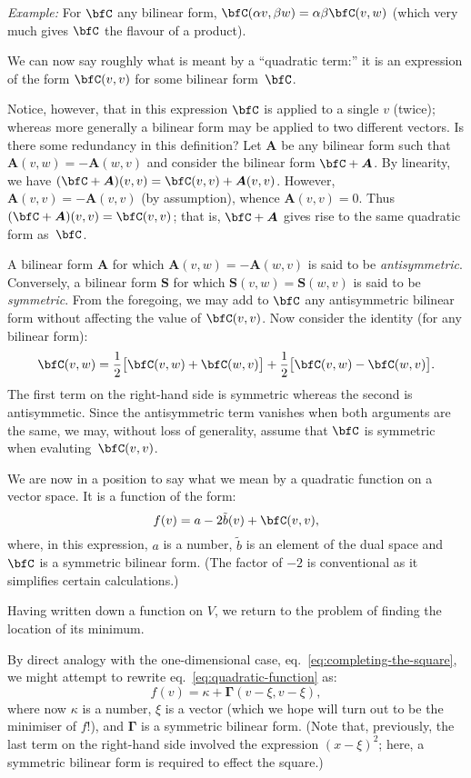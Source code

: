 \documentclass[10pt, a4paper]{article}
\newcommand{\eg}{\emph{Example:}}
\begin{document}
\eg{} For $\bfC$ any bilinear form,
$\bfC(\alpha v, \beta w) = \alpha\beta \bfC(v,w)$ (which very much gives $\bfC$ the flavour of a
product).

We can now say roughly what is meant by a “quadratic term:” it is an
expression of the form $\bfC(v,v)$ for some bilinear form~$\bfC$.

Notice, however, that in this expression $\bfC$ is applied to a single
$v$ (twice); whereas more generally a bilinear form may be applied to
two different vectors. Is there some redundancy in this definition?
Let $\bm{A}$ be any bilinear form such that $\bm{A}(v,w)=-\bm{A}(w,v)$ and consider
the bilinear form $\bfC+\bm{A}$. By linearity, we have $(\bfC+\bm{A})(v, v) =
\bfC(v,v)+\bm{A}(v,v)$. However, $\bm{A}(v,v)=-\bm{A}(v,v)$ (by assumption), whence
$\bm{A}(v,v)=0$. Thus $(\bfC+\bm{A})(v,v)=\bfC(v,v)$; that is, $\bfC+\bm{A}$ gives rise to the
same quadratic form as~$\bfC$.

A bilinear form $\bm{A}$ for which $\bm{A}(v,w)=-\bm{A}(w,v)$ is said to be
\emph{antisymmetric}. Conversely, a bilinear form $\bm{S}$ for which
$\bm{S}(v,w)=\bm{S}(w,v)$ is said to be \emph{symmetric}. From the foregoing, we
may add to $\bfC$ any antisymmetric bilinear form without affecting the
value of $\bfC(v,v)$. Now consider the identity (for any bilinear form):
\[
  \bfC(v, w) = \frac{1}{2}\bigl[\bfC(v,w) + \bfC(w,v)\bigr]
  + \frac{1}{2}\bigl[\bfC(v,w) - \bfC(w,v)\bigr].
\]
The first term on the right-hand side is symmetric whereas the second
is antisymmetic. Since the antisymmetric term vanishes when both
arguments are the same, we may, without loss of generality, assume
that $\bfC$ is symmetric when evaluting~$\bfC(v,v)$.

We are now in a position to say what we mean by a quadratic function on
a vector space. It is a function of the form:
\begin{equation}
  f(v) = a - 2\tilde{b}(v) + \bfC(v, v),
  \label{eq:quadratic-function}
\end{equation}
where, in this expression, $a$ is a number, $\tilde{b}$ is an element
of the dual space and $\bfC$ is a symmetric bilinear form. (The factor of
$-2$ is conventional as it simplifies certain calculations.)

Having written down a function on $V$, we return to the problem of
finding the location of its minimum.

By direct analogy with the one-dimensional case,
eq.~\eqref{eq:completing-the-square}, we might attempt to rewrite
eq.~\eqref{eq:quadratic-function} as:
\begin{equation}
  f(v) = \kappa + \bm{\Gamma}(v - \xi, v - \xi),
  \label{eq:vector-square}
\end{equation}
where now $\kappa$ is a number, $\xi$ is a vector (which we hope will turn
out to be the minimiser of $f$!), and $\bm{\Gamma}$ is a symmetric bilinear
form. (Note that, previously, the last term on the right-hand side
involved the expression ${(x-\xi)}^2$; here, a symmetric bilinear form
is required to effect the square.)
\end{document}
